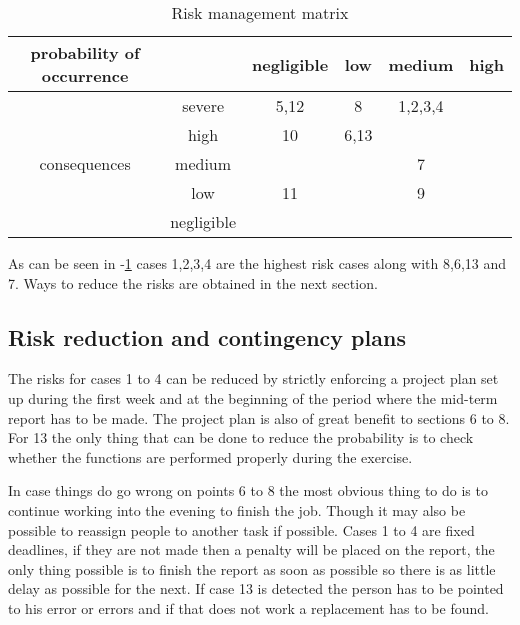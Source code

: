\begin{table}
	\centering
		\begin{tabular}{c|c||c|c|c|c}
		probability of occurrence &  & negligible & low & medium & high \\ \hline \hline
		 & severe & 5,12 & 8 & 1,2,3,4 &  \\ \hline
		 & high & 10 & 6,13 &  &  \\ \hline
		consequences & medium & & & 7 & \\ \hline
		 & low & 11 & & 9 & \\ \hline
		 & negligible & & & & \\
		\hline
	\end{tabular}
	\caption{Risk management matrix}
	\label{sec:Riskmanagementmatrix}
\end{table}

As can be seen in -\ref{sec:Riskmanagementmatrix} cases 1,2,3,4 are the highest risk cases along with 8,6,13 and 7. Ways to reduce the risks are obtained in the next section.

\subsection{Risk reduction and contingency plans}
The risks for cases 1 to 4 can be reduced by strictly enforcing a project plan set up during the first week and at the beginning of the period where the mid-term report has to be made. The project plan is also of great benefit to sections 6 to 8. For 13 the only thing that can be done to reduce the probability is to check whether the functions are performed properly during the exercise.

In case things do go wrong on points 6 to 8 the most obvious thing to do is to continue working into the evening to finish the job. Though it may also be possible to reassign people to another task if possible. Cases 1 to 4 are fixed deadlines, if they are not made then a penalty will be placed on the report, the only thing possible is to finish the report as soon as possible so there is as little delay as possible for the next. If case 13 is detected the person has to be pointed to his error or errors and if that does not work a replacement has to be found.